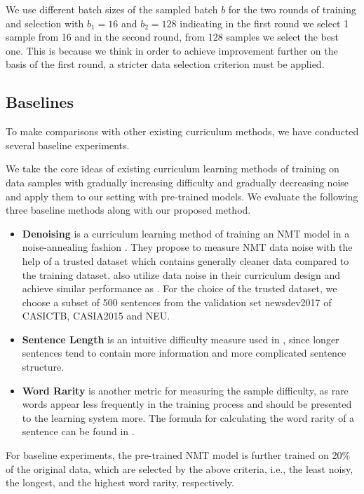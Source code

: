 \documentclass[letterpaper]{article}
\begin{document}
We use different batch sizes of the sampled batch $b$ for the two rounds of training and selection with $b_1=16$ and $b_2=128$ indicating in the first round we select 1 sample from 16 and in the second round, from 128 samples we select the best one. This is because we think in order to achieve improvement further on the basis of the first round, a stricter data selection criterion must be applied.

\subsection{Baselines}
To make comparisons with other existing curriculum methods, we have conducted several baseline experiments.

We take the core ideas of existing curriculum learning methods of training on data samples with gradually increasing difficulty \cite{platanios2019competence} and gradually decreasing noise \cite{wang2018denoising} and apply them to our setting with pre-trained models. We evaluate the following three baseline methods along with our proposed method.

\begin{itemize}
	\item{\textbf{Denoising}} is a curriculum learning method of training an NMT model in a noise-annealing fashion \cite{wang2018denoising}. They propose to measure NMT data noise with the help of a trusted dataset which contains generally cleaner data compared to the training dataset. \cite{kumar2019reinforcement} also utilize data noise in their curriculum design and achieve similar performance as \cite{wang2018denoising}. For the choice of the trusted dataset, we choose a subset of 500 sentences from the validation set newsdev2017 of CASICTB, CASIA2015 and NEU.
	\item{\textbf{Sentence Length}} is an intuitive difficulty measure used in \cite{platanios2019competence}, since longer sentences tend to contain more information and more complicated sentence structure.
	\item{\textbf{Word Rarity}} is another metric for measuring the sample difficulty, as rare words appear less frequently in the training process and should be presented to the learning system more. The formula for calculating the word rarity of a sentence can be found in \cite{platanios2019competence}.
\end{itemize}

For baseline experiments, the pre-trained NMT model is further trained on 20\% of the original data, which are selected by the above criteria, i.e., the least noisy, the longest, and the highest word rarity, respectively.
\end{document}
